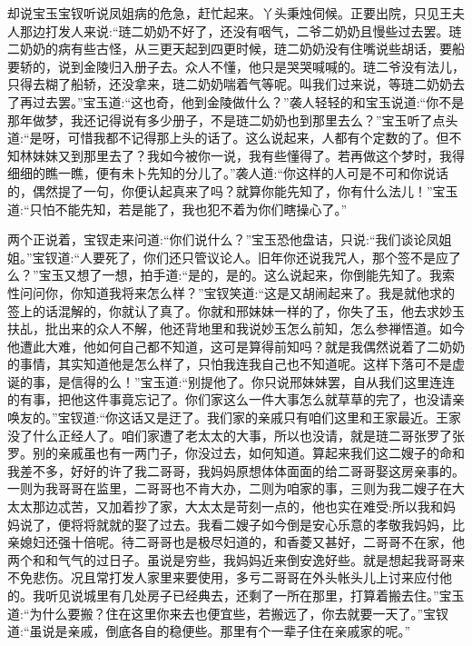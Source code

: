 


\begin{parag}
    却说宝玉宝钗听说凤姐病的危急，赶忙起来。丫头秉烛伺候。正要出院，只见王夫人那边打发人来说:“琏二奶奶不好了，还没有咽气，二爷二奶奶且慢些过去罢。琏二奶奶的病有些古怪，从三更天起到四更时候，琏二奶奶没有住嘴说些胡话，要船要轿的，说到金陵归入册子去。众人不懂，他只是哭哭喊喊的。琏二爷没有法儿，只得去糊了船轿，还没拿来，琏二奶奶喘着气等呢。叫我们过来说，等琏二奶奶去了再过去罢。”宝玉道:“这也奇，他到金陵做什么？”袭人轻轻的和宝玉说道:“你不是那年做梦，我还记得说有多少册子，不是琏二奶奶也到那里去么？”宝玉听了点头道:“是呀，可惜我都不记得那上头的话了。这么说起来，人都有个定数的了。但不知林妹妹又到那里去了？我如今被你一说，我有些懂得了。若再做这个梦时，我得细细的瞧一瞧，便有未卜先知的分儿了。”袭人道:“你这样的人可是不可和你说话的，偶然提了一句，你便认起真来了吗？就算你能先知了，你有什么法儿！”宝玉道:“只怕不能先知，若是能了，我也犯不着为你们瞎操心了。”
\end{parag}


\begin{parag}
    两个正说着，宝钗走来问道:“你们说什么？”宝玉恐他盘诘，只说:“我们谈论凤姐姐。”宝钗道:“人要死了，你们还只管议论人。旧年你还说我咒人，那个签不是应了么？”宝玉又想了一想，拍手道:“是的，是的。这么说起来，你倒能先知了。我索性问问你，你知道我将来怎么样？”宝钗笑道:“这是又胡闹起来了。我是就他求的签上的话混解的，你就认了真了。你就和邢妹妹一样的了，你失了玉，他去求妙玉扶乩，批出来的众人不解，他还背地里和我说妙玉怎么前知，怎么参禅悟道。如今他遭此大难，他如何自己都不知道，这可是算得前知吗？就是我偶然说着了二奶奶的事情，其实知道他是怎么样了，只怕我连我自己也不知道呢。这样下落可不是虚诞的事，是信得的么！”宝玉道:“别提他了。你只说邢妹妹罢，自从我们这里连连的有事，把他这件事竟忘记了。你们家这么一件大事怎么就草草的完了，也没请亲唤友的。”宝钗道:“你这话又是迂了。我们家的亲戚只有咱们这里和王家最近。王家没了什么正经人了。咱们家遭了老太太的大事，所以也没请，就是琏二哥张罗了张罗。别的亲戚虽也有一两门子，你没过去，如何知道。算起来我们这二嫂子的命和我差不多，好好的许了我二哥哥，我妈妈原想体体面面的给二哥哥娶这房亲事的。一则为我哥哥在监里，二哥哥也不肯大办，二则为咱家的事，三则为我二嫂子在大太太那边忒苦，又加着抄了家，大太太是苛刻一点的，他也实在难受:所以我和妈妈说了，便将将就就的娶了过去。我看二嫂子如今倒是安心乐意的孝敬我妈妈，比亲媳妇还强十倍呢。待二哥哥也是极尽妇道的，和香菱又甚好，二哥哥不在家，他两个和和气气的过日子。虽说是穷些，我妈妈近来倒安逸好些。就是想起我哥哥来不免悲伤。况且常打发人家里来要使用，多亏二哥哥在外头帐头儿上讨来应付他的。我听见说城里有几处房子已经典去，还剩了一所在那里，打算着搬去住。”宝玉道:“为什么要搬？住在这里你来去也便宜些，若搬远了，你去就要一天了。”宝钗道:“虽说是亲戚，倒底各自的稳便些。那里有个一辈子住在亲戚家的呢。”
\end{parag}



